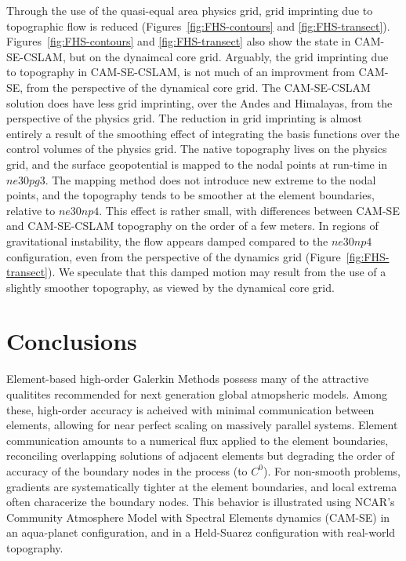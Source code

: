 \documentclass[twocol]{ametsoc}
\begin{document}
Through the use of the quasi-equal area physics grid, grid imprinting due to topographic flow is reduced (Figures~\ref{fig:FHS-contours} and \ref{fig:FHS-transect}). Figures~\ref{fig:FHS-contours} and \ref{fig:FHS-transect} also show the state in CAM-SE-CSLAM, but on the dynaimcal core grid. Arguably, the grid imprinting due to topography in CAM-SE-CSLAM, is not much of an improvment from CAM-SE, from the perspective of the dynamical core grid. The CAM-SE-CSLAM solution does have less grid imprinting, over the Andes and Himalayas, from the perspective of the physics grid. The reduction in grid imprinting is almost entirely a result of the smoothing effect of integrating the basis functions over the control volumes of the physics grid. The native topography lives on the physics grid, and the surface geopotential is mapped to the nodal points at run-time in $ne30pg3$. The mapping method does not introduce new extreme to the nodal points, and the topography tends to be smoother at the element boundaries, relative to $ne30np4$. This effect is rather small, with differences between CAM-SE and CAM-SE-CSLAM topography on the order of a few meters. In regions of gravitational instability, the flow appears damped compared to the $ne30np4$ configuration, even from the perspective of the dynamics grid (Figure~\ref{fig:FHS-transect}). We speculate that this damped motion may result from the use of a slightly smoother topography, as viewed by the dynamical core grid.  





\section{Conclusions}

Element-based high-order Galerkin Methods possess many of the attractive qualitites recommended for next generation global atmopsheric models. Among these, high-order accuracy is acheived with minimal communication between elements, allowing for near perfect scaling on massively parallel systems. Element communication amounts to a numerical flux applied to the element boundaries, reconciling overlapping solutions of adjacent elements but degrading the order of accuracy of the boundary nodes in the process (to $C^0$). For non-smooth problems, gradients are systematically tighter at the element boundaries, and local extrema often characerize the boundary nodes. This behavior is illustrated using NCAR's Community Atmosphere Model with Spectral Elements dynamics (CAM-SE) in an aqua-planet configuration, and in a Held-Suarez configuration with real-world topography. 
\end{document}
